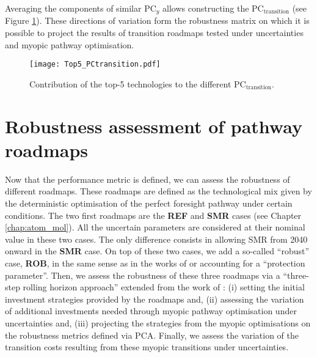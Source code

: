 \newpage
Averaging the components of similar $\text{PC}_y$ allows constructing the $\text{PC}_{\text{transition}}$ (see Figure \ref{fig:Top5_PC_transition}). These directions of variation form the robustness matrix on which it is possible to project the results of transition roadmaps tested under uncertainties and myopic pathway optimisation.

\begin{figure}[!htbp]
\centering
\texttt{[image: Top5\_PCtransition.pdf]}
\caption{Contribution of the top-5 technologies to the different $\text{PC}_{\text{transition}}$. }
\label{fig:Top5_PC_transition}
\end{figure}

\newpage
\section{Robustness assessment of pathway roadmaps}
\label{sec:RobPol:Rob_Assessment}
Now that the performance metric is defined, we can assess the robustness of different roadmaps. These roadmaps are defined as the technological mix given by the deterministic optimisation of the perfect foresight pathway under certain conditions. The two first roadmaps are the \textbf{REF} and \textbf{SMR} cases (see Chapter \ref{chap:atom_mol}). All the uncertain parameters are considered at their nominal value in these two cases. The only difference consists in allowing \gls{SMR} from 2040 onward in the \textbf{SMR} case. On top of these two cases, we add a so-called ``robust'' case, \textbf{ROB}, in the same sense as in the works of \citet{bertsimas2004price} or \citet{Moret2017PhDThesis} accounting for a ``protection parameter''. Then, we assess the robustness of these three roadmaps via a ``three-step rolling horizon approach'' extended from the work of \citet{moret2020overcapacity}: (i) setting the initial investment strategies provided by the roadmaps and, (ii) assessing the variation of additional investments needed through myopic pathway optimisation under uncertainties and, (iii) projecting the strategies from the myopic optimisations on the robustness metrics defined via \gls{PCA}. Finally, we assess the variation of the transition costs resulting from these myopic transitions under uncertainties.

